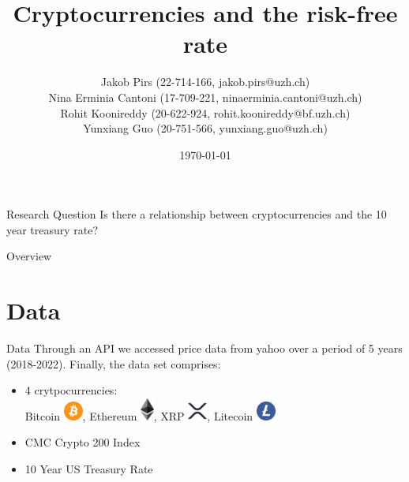 \documentclass[11pt]{beamer}
\author{\small Jakob Pirs (22-714-166, jakob.pirs@uzh.ch)\\
Nina Erminia Cantoni (17-709-221, ninaerminia.cantoni@uzh.ch)\\
Rohit Koonireddy (20-622-924, rohit.koonireddy@bf.uzh.ch)\\
Yunxiang Guo (20-751-566, yunxiang.guo@uzh.ch)\\}
\title{Cryptocurrencies and the risk-free rate}
\institute[]{University of Zurich, Department of Banking and Finance}
\date{\today}
\begin{document}
\begin{frame}
\titlepage
\end{frame}


\begin{frame}{Research Question}
 \centering Is there a relationship between cryptocurrencies and the 10 year treasury rate?
\end{frame}

\begin{frame}{Overview}
\tableofcontents 
\end{frame}


\section{Data}
\begin{frame}{Data}
Through an API we accessed price data from yahoo over a period of 5 years (2018-2022). Finally, the data set comprises:
 \begin{itemize}
        \item 4 crytpocurrencies: \\
        Bitcoin \includegraphics[width=0.05\textwidth]{images/Bitcoin.png}, Ethereum \includegraphics[width=0.035\textwidth]{images/ETH.png}, XRP \includegraphics[width=0.05\textwidth]{images/XRP.png}, Litecoin \includegraphics[width=0.05\textwidth]{images/LTC.png}
        
        \medskip
        
        \item CMC Crypto 200 Index
        
        \medskip
        
        \item 10 Year US Treasury Rate
    \end{itemize}

\end{frame}
\end{document}
